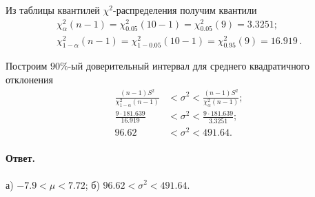 \noindent
Из таблицы квантилей $\chi^2$-распределения получим квантили
\begin{gather*}
    \chi^2_{\alpha}(n - 1) = \chi^2_{0.05}(10 - 1) = \chi^2_{0.05}(9) = 3.3251;
    \\
    \chi^2_{1 - \alpha}(n - 1) = \chi^2_{1 - 0.05}(10 - 1) = \chi^2_{0.95}(9) = 16.919\,.
\end{gather*}

\noindent
Построим $90\%$-ый доверительный интервал для среднего квадратичного отклонения
\begin{align*}
    \frac{(n-1)S^2}{\chi^2_{1 - \alpha}(n - 1)} &< \sigma^2 < \frac{(n-1)S^2}{\chi^2_{\alpha}(n - 1)};
    \\
    \frac{9 \cdot 181.639}{16.919} &< \sigma^2 < \frac{9 \cdot 181.639}{3.3251};
    \\
    96.62 &< \sigma^2 < 491.64.
\end{align*}

\paragraph{Ответ.} а) $-7.9 < \mu < 7.72$; б) $96.62 < \sigma^2 < 491.64$.